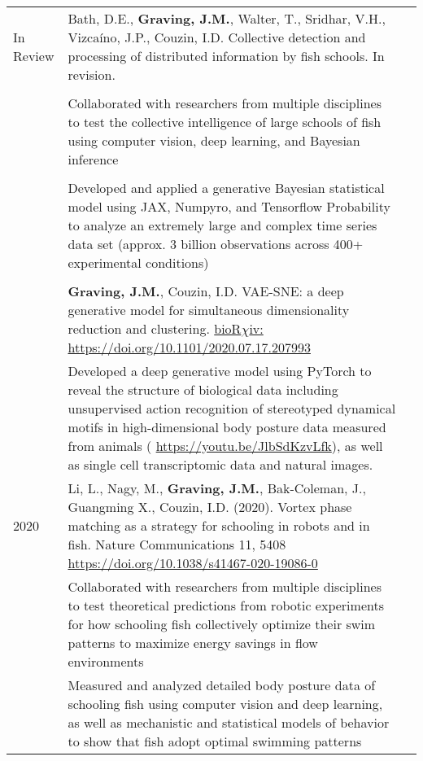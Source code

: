 \documentclass[letterpaper,10pt,oneside]{article}
\newcommand{\tabitem}{\hspace{2mm}\textbullet\hspace{2mm}}
\begin{document}
\begin{small}
\begin{longtable}{@{} l p{5in}l}
\large{In Review}
& Bath, D.E., \textbf{Graving, J.M.}, Walter, T., Sridhar, V.H.,  Vizcaíno, J.P., Couzin, I.D. Collective detection and processing of distributed information by fish schools. In revision. \\
& \\
& \tabitem Collaborated with researchers from multiple disciplines to test the collective intelligence of large schools of fish using computer vision, deep learning, and Bayesian inference \\
& \\
& \tabitem Developed and applied a generative Bayesian statistical model using JAX, Numpyro, and Tensorflow Probability to analyze an extremely large and complex time series data set (approx. 3 billion observations across 400+ experimental conditions) \\
& \\
& \textbf{Graving, J.M.}, Couzin, I.D.  VAE-SNE: a deep generative model for simultaneous dimensionality reduction and clustering. \href{https://doi.org/10.1101/2020.07.17.207993}{bioR$\chi$iv: https://doi.org/10.1101/2020.07.17.207993}  \vspace{2mm}\\
& 	\tabitem Developed a deep generative model using PyTorch to reveal the structure of biological data including unsupervised action recognition of stereotyped dynamical motifs in high-dimensional body posture data measured from animals ( \href{https://youtu.be/JlbSdKzvLfk}{https://youtu.be/JlbSdKzvLfk}), as well as single cell transcriptomic data and natural images. \vspace{2mm}\\
\large{2020}
& Li, L., Nagy, M., \textbf{Graving, J.M.}, Bak-Coleman, J., Guangming X., Couzin, I.D. (2020). Vortex phase matching as a strategy for schooling in robots and in fish. Nature Communications 11, 5408 \href{https://doi.org/10.1038/s41467-020-19086-0 }{https://doi.org/10.1038/s41467-020-19086-0} \vspace{2mm} \\
& 	\tabitem Collaborated with researchers from multiple disciplines to test theoretical predictions from robotic experiments for how schooling fish collectively optimize their swim patterns to maximize energy savings in flow environments \vspace{1mm} \\
& 	\tabitem Measured and analyzed detailed body posture data of schooling fish using computer vision and deep learning, as well as mechanistic and statistical models of behavior to show that fish adopt optimal swimming patterns\vspace{5mm}\\


\end{longtable}
\end{small}
\end{document}
